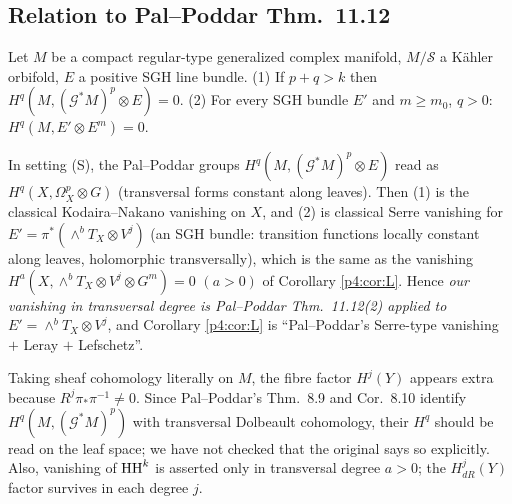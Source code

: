 \subsection{Relation to Pal--Poddar Thm.\ 11.12}\label{p4:sec:PP}
\begin{thm}\tC
Let $M$ be a compact regular-type generalized complex manifold, $M/\mathcal S$ a Kähler orbifold, $E$ a positive SGH line bundle. (1) If $p+q>k$ then $H^q(M,(\mathcal G^*M)^p\otimes E)=0$. (2) For every SGH bundle $E'$ and $m\ge m_0$, $q>0$: $H^q(M,E'\otimes E^m)=0$.
\end{thm}
\begin{prop}\tP\label{p4:prop:PPcompare}
In setting (S), the Pal--Poddar groups $H^q(M,(\mathcal G^*M)^p\otimes E)$ read as $H^q(X,\Omega^p_X\otimes G)$ (transversal forms constant along leaves). Then (1) is the classical Kodaira--Nakano vanishing on $X$, and (2) is classical Serre vanishing for $E'=\pi^*(\wedge^bT_X\otimes V^j)$ (an SGH bundle: transition functions locally constant along leaves, holomorphic transversally), which is the same as the vanishing $H^a(X,\wedge^bT_X\otimes V^j\otimes G^m)=0$ $(a>0)$ of Corollary \ref{p4:cor:L}. Hence \emph{our vanishing in transversal degree is Pal--Poddar Thm.\ 11.12(2) applied to $E'=\wedge^bT_X\otimes V^j$}, and Corollary \ref{p4:cor:L} is ``Pal--Poddar's Serre-type vanishing $+$ Leray $+$ Lefschetz''.
\end{prop}
\begin{rem}[\tQ]
Taking sheaf cohomology literally on $M$, the fibre factor $H^j(Y)$ appears extra because $R^j\pi_*\pi^{-1}\neq0$. Since Pal--Poddar's Thm.\ 8.9 and Cor.\ 8.10 identify $H^q(M,(\mathcal G^*M)^p)$ with transversal Dolbeault cohomology, their $H^q$ should be read on the leaf space; we have not checked that the original says so explicitly. Also, vanishing of $\mathrm{HH}^k$ is asserted only in transversal degree $a>0$; the $H^j_{dR}(Y)$ factor survives in each degree $j$.
\end{rem}

